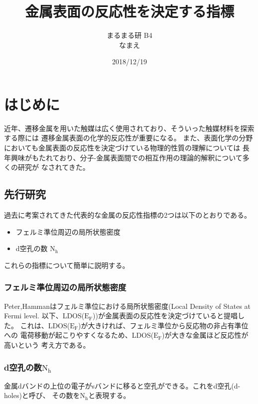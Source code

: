 \documentclass[12pt]{ltjsarticle}
\begin{document}
\begin{titlepage}
\title{金属表面の反応性を決定する指標}
\author{まるまる研 B4 \\ なまえ}
\date{2018/12/19}
\maketitle
\tableofcontents
\end{titlepage}

\section{はじめに}
近年、遷移金属を用いた触媒は広く使用されており、そういった触媒材料を探索する際には
遷移金属表面の化学的反応性が重要になる。
また、表面化学の分野においても金属表面の反応性を決定づけている物理的性質の理解については
長年興味がもたれており、分子-金属表面間での相互作用の理論的解釈について多くの研究が
なされてきた。 \\

\subsection{先行研究}

過去に考案されてきた代表的な金属の反応性指標の2つは以下のとおりである。

\begin{itemize}
 \item フェルミ準位周辺の局所状態密度
 \item d空孔の数 $\text{N}_\text{h}$
\end{itemize}

これらの指標について簡単に説明する。

\subsubsection{フェルミ準位周辺の局所状態密度}
Peter,Hammanはフェルミ準位における局所状態密度(Local Density of States at Fermi level.
以下、LDOS($\text{E}_\text{F}$))が金属表面の反応性を決定づけていると提唱した。
これは、LDOS($\text{E}_\text{F}$)が大きければ、フェルミ準位から反応物の非占有準位への
電荷移動が起こりやすくなるため、LDOS($\text{E}_\text{F}$)が大きな金属ほど反応性が高いという
考え方である。\cite{PeterJ.Feibelman1984}

\subsubsection{d空孔の数$\text{N}_\text{h}$}
金属dバンドの上位の電子がsバンドに移ると空孔ができる。これをd空孔(d-holes)と呼び、
その数を$\text{N}_\text{h}$と表現する。
\end{document}
